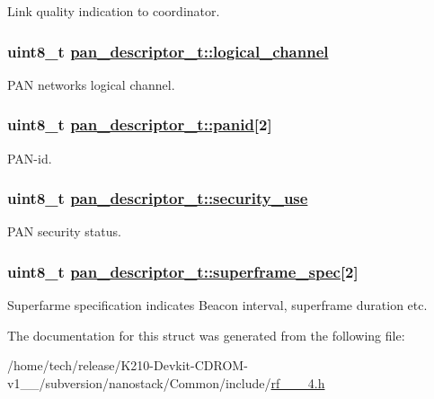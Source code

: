 Link quality indication to coordinator. \hypertarget{structpan__descriptor__t_17a106035a332e15842bf81b5038a813}{
\subsubsection[logical\_\-channel]{\setlength{\rightskip}{0pt plus 5cm}uint8\_\-t \hyperlink{structpan__descriptor__t_17a106035a332e15842bf81b5038a813}{pan\_\-descriptor\_\-t::logical\_\-channel}}}
\label{structpan__descriptor__t_17a106035a332e15842bf81b5038a813}


PAN networks logical channel. \hypertarget{structpan__descriptor__t_e94a30aedfc41b7ca0e551bd8928a3ab}{
\subsubsection[panid]{\setlength{\rightskip}{0pt plus 5cm}uint8\_\-t \hyperlink{structpan__descriptor__t_e94a30aedfc41b7ca0e551bd8928a3ab}{pan\_\-descriptor\_\-t::panid}\mbox{[}2\mbox{]}}}
\label{structpan__descriptor__t_e94a30aedfc41b7ca0e551bd8928a3ab}


PAN-id. \hypertarget{structpan__descriptor__t_d1f137dbd55028eaedf8ff0b444dfe25}{
\subsubsection[security\_\-use]{\setlength{\rightskip}{0pt plus 5cm}uint8\_\-t \hyperlink{structpan__descriptor__t_d1f137dbd55028eaedf8ff0b444dfe25}{pan\_\-descriptor\_\-t::security\_\-use}}}
\label{structpan__descriptor__t_d1f137dbd55028eaedf8ff0b444dfe25}


PAN security status. \hypertarget{structpan__descriptor__t_53f9ddb90f42af95b7a62d48c9a891a0}{
\subsubsection[superframe\_\-spec]{\setlength{\rightskip}{0pt plus 5cm}uint8\_\-t \hyperlink{structpan__descriptor__t_53f9ddb90f42af95b7a62d48c9a891a0}{pan\_\-descriptor\_\-t::superframe\_\-spec}\mbox{[}2\mbox{]}}}
\label{structpan__descriptor__t_53f9ddb90f42af95b7a62d48c9a891a0}


Superfarme specification indicates Beacon interval, superframe duration etc. 

The documentation for this struct was generated from the following file:\begin{CompactItemize}
\item 
/home/tech/release/K210-Devkit-CDROM-v1\_\_/subversion/nanostack/Common/include/\hyperlink{rf__802__15__4_8h}{rf\_\_\_\-4.h}\end{CompactItemize}
